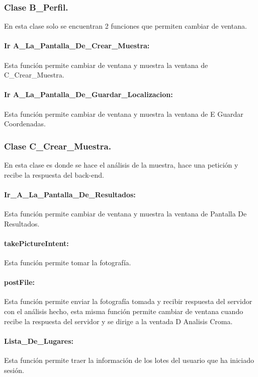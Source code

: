\subsubsection{Clase B\_Perfil.}
En esta clase solo se encuentran 2 funciones que permiten cambiar de ventana.

\paragraph {Ir A\_La\_Pantalla\_De\_Crear\_Muestra:} Esta función permite cambiar de ventana y muestra la ventana de C\_Crear\_Muestra.

\paragraph {Ir A\_La\_Pantalla\_De\_Guardar\_Localizacion:} Esta función permite cambiar de ventana y muestra la ventana de E Guardar Coordenadas.

\subsubsection{Clase C\_Crear\_Muestra.}
En esta clase es donde se hace el análisis de la muestra, hace una petición y recibe la respuesta del back-end.

\paragraph {Ir\_A\_La\_Pantalla\_De\_Resultados:} Esta función permite cambiar de ventana y muestra la ventana de Pantalla De Resultados.
    
\paragraph {takePictureIntent:} Esta función permite tomar la fotografía.
    
\paragraph {postFile:} Esta función permite enviar la fotografía tomada y recibir respuesta del servidor con el análisis hecho, esta misma 
función permite cambiar de ventana cuando recibe la respuesta del servidor y se dirige a la ventada D Analisis Croma.

\paragraph {Lista\_De\_Lugares:} Esta función permite traer la información de los lotes del usuario que ha iniciado sesión.

